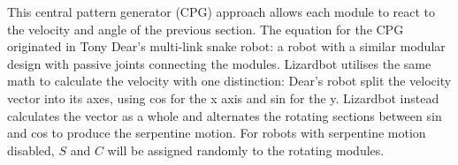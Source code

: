 \documentclass{article}
\begin{document}

This central pattern generator (CPG) approach allows each module to react to the velocity and angle of the previous section. The equation for the CPG originated in Tony Dear’s multi-link snake robot: a robot with a similar modular design with passive joints connecting the modules.  Lizardbot utilises the same math to calculate the velocity with one distinction: Dear’s robot split the velocity vector into its axes, using cos for the x axis and sin for the y. Lizardbot instead calculates the vector as a whole and alternates the rotating sections between sin and cos to produce the serpentine motion. For robots with serpentine motion disabled, $S$ and $C$ will be assigned randomly to the rotating modules.\\
\end{document}
